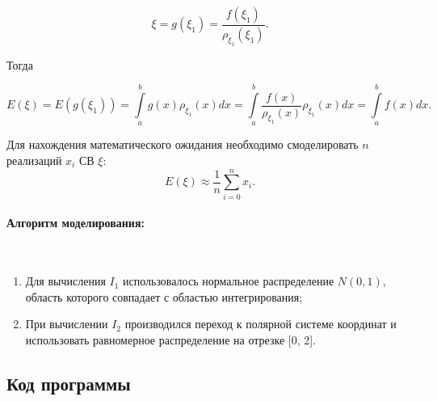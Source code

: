 \begin{equation}
	\xi = g(\xi_{1}) = \frac{f(\xi_{1})}{\rho_{\xi_{1}}(\xi_{1})}.
\end{equation}

Тогда

\begin{equation}
	E(\xi) = E(g(\xi_{1})) = \int\limits_{a}^{b}g(x)\rho_{\xi_{1}}(x)dx = \int\limits_{a}^{b}\frac{f(x)}{\rho_{\xi_{1}}(x)}\rho_{\xi_{1}}(x)dx = \int\limits_{a}^{b}f(x)dx.
\end{equation}

Для нахождения математического ожидания необходимо смоделировать $n$ реализаций $x_{i}$ СВ $\xi$:
\begin{equation}
	E(\xi) \approx \frac{1}{n} \sum\limits_{i=0}^{n}x_{i}.
\end{equation}

\paragraph{Алгоритм моделирования:}\
\

\begin{enumerate}
	\item Для вычисления $I_{1}$ использовалось нормальное распределение $N(0,1)$, область которого совпадает с областью интегрирования;
	\item При вычислении $I_{2}$ производился переход к полярной системе координат и использовать равномерное распределение на отрезке [0, 2].
\end{enumerate}

\subsection{Код программы}


